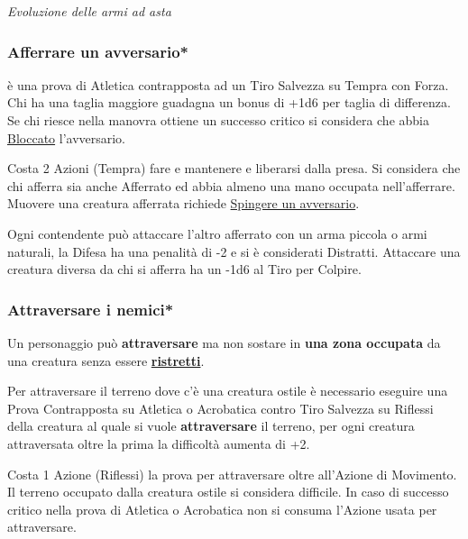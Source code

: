\begin{multicols}{2}
\begin{center}
	\emph{Evoluzione delle armi ad asta}
\end{center}

\subsubsection{Afferrare un avversario*}\label{afferrareunavversario}\hypertarget{afferrareunavversario}{}

è una prova di Atletica contrapposta ad un Tiro Salvezza su Tempra con Forza. Chi ha una taglia maggiore guadagna un bonus di +1d6 per taglia di differenza. Se chi riesce nella manovra ottiene un successo critico si considera che abbia \hyperlink{bloccato}{Bloccato} l'avversario.

Costa 2 Azioni (Tempra) fare e mantenere e liberarsi dalla presa. Si considera che chi afferra sia anche Afferrato ed abbia almeno una mano occupata nell'afferrare.
Muovere una creatura afferrata richiede \hyperlink{spingereavversario}{Spingere un avversario}.

Ogni contendente può attaccare l'altro afferrato con un arma piccola o armi naturali, la Difesa ha una penalità di -2 e si è considerati Distratti. Attaccare una creatura diversa da chi si afferra ha un -1d6 al Tiro per Colpire.

\subsubsection{Attraversare i nemici*}\label{attraversonemici}\hypertarget{attraversarenemici}{}\hypertarget{destreggiarsi}{}

Un personaggio può \textbf{attraversare} ma non sostare in \textbf{una zona occupata} da una creatura senza essere \hyperlink{ristretto}{\textbf{ristretti}}.

Per attraversare il terreno dove c'è una creatura ostile è necessario eseguire una Prova Contrapposta su Atletica o Acrobatica contro Tiro Salvezza su Riflessi della creatura al quale si vuole \textbf{attraversare} il terreno, per ogni creatura attraversata oltre la prima la difficoltà aumenta di +2.

Costa 1 Azione (Riflessi) la prova per attraversare oltre all'Azione di Movimento. Il terreno occupato dalla creatura ostile si considera difficile. In caso di successo critico nella prova di Atletica o Acrobatica non si consuma l'Azione usata per attraversare.


\end{multicols}
